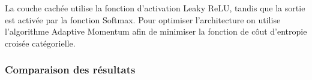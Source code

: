 \begin{multicols}{2}
La couche cachée utilise la fonction d’activation Leaky ReLU, 
tandis que la sortie est activée par la fonction Softmax. Pour optimiser l'architecture
on utilise l'algorithme Adaptive Momentum afin de minimiser la fonction de côut 
d'entropie croisée catégorielle. \\

\subsubsection{Comparaison des résultats}

\end{multicols}